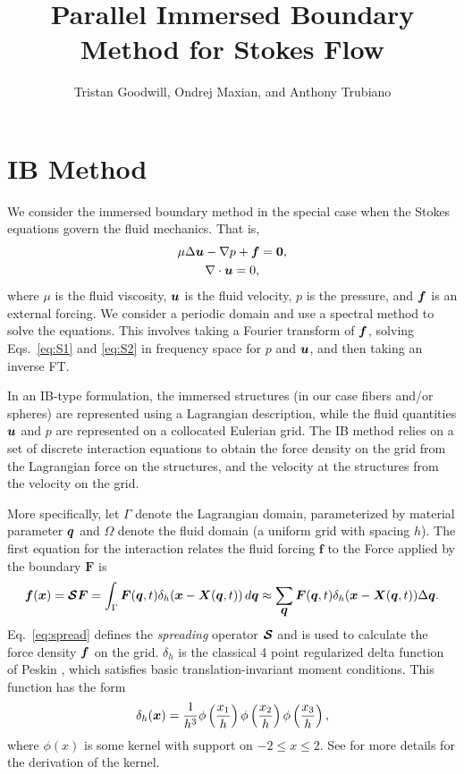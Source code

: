 \documentclass[]{article}
\title{Parallel Immersed Boundary Method for Stokes Flow}
\author{Tristan Goodwill, Ondrej Maxian, and Anthony Trubiano}
\newcommand{\bm}[1]{\mbox{\boldmath $ #1 $}}    %
\renewcommand{\vec}[1]{\bm{#1}}                 %
\begin{document}
\maketitle

\section{IB Method}
We consider the immersed boundary method in the special case when the Stokes equations govern the fluid mechanics. That is, 
\begin{gather}
\label{eq:S1}
\mu \Delta \bm{u} - \nabla p + \bm{f} = \bm{0}, \\
\label{eq:S2}
\nabla \cdot \bm{u} = 0,
\end{gather}
where $\mu$ is the fluid viscosity, $\vec{u}$ is the fluid velocity, $p$ is the pressure, and $\vec{f}$ is an external forcing. We consider a periodic domain and use a spectral method to solve the equations. This involves taking a Fourier transform of $\bm{f}$, solving Eqs.\ \eqref{eq:S1} and \eqref{eq:S2} in frequency space for $p$ and $\bm{u}$, and then taking an inverse FT. 

In an IB-type formulation, the immersed structures (in our case fibers and/or spheres) are represented using a Lagrangian description, while the fluid quantities $\bm{u}$ and $p$ are represented on a collocated Eulerian grid. The IB method relies on a set of discrete interaction equations to obtain the force density on the grid from the Lagrangian force on the structures, and the velocity at the structures from the velocity on the grid. 

More specifically, let $\Gamma$ denote the Lagrangian domain, parameterized by material parameter $\bm{q}$ and $\Omega$ denote the fluid domain (a uniform grid with spacing $h$). The first equation for the interaction relates the fluid forcing $\boldsymbol{f}$ to the Force applied by the boundary $\boldsymbol{F}$ is
\begin{equation}
\label{eq:spread}
\bm{f}(\bm{x}) = \bm{\mathcal{S}} \bm{F}  = \int_{\Gamma}  \bm{F}(\bm{q},t) \delta_h (\bm{x} - \bm{X}(\bm{q},t))\, d \bm{q}  \approx \sum_{\bm{q}} \bm{F}(\bm{q},t) \delta_h (\bm{x} - \bm{X}(\bm{q},t)) \Delta \bm{q}. 
\end{equation}
Eq.\ \eqref{eq:spread} defines the \textit{spreading} operator $\bm{\mathcal{S}}$ and is used to calculate the force density $\bm{f}$ on the grid. $\delta_h$ is the classical 4 point regularized delta function of Peskin \cite{peskin2002acta}, which satisfies basic translation-invariant moment conditions. This function has the form
\begin{equation}
\delta_h(\bm{x}) = \frac{1}{h^3} \phi\left(\frac{x_1}{h}\right) \phi\left(\frac{x_2}{h}\right) \phi\left(\frac{x_3}{h}\right), 
\end{equation}
where $\phi(x)$ is some kernel with support on $-2 \leq x \leq 2$. See \cite{peskin2002acta} for more details for the derivation of the kernel. 
\end{document}
